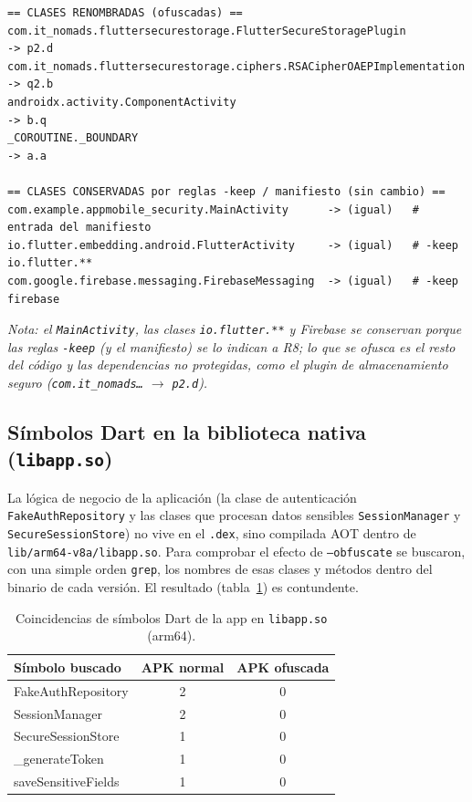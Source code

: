 \documentclass[12pt,letterpaper]{article}
\begin{document}
\begin{lstlisting}[caption={Correspondencias reales de nombres (\texttt{mapping.txt} de R8).},label=lst:jadx]
== CLASES RENOMBRADAS (ofuscadas) ==
com.it_nomads.fluttersecurestorage.FlutterSecureStoragePlugin          -> p2.d
com.it_nomads.fluttersecurestorage.ciphers.RSACipherOAEPImplementation -> q2.b
androidx.activity.ComponentActivity                                    -> b.q
_COROUTINE._BOUNDARY                                                   -> a.a

== CLASES CONSERVADAS por reglas -keep / manifiesto (sin cambio) ==
com.example.appmobile_security.MainActivity      -> (igual)   # entrada del manifiesto
io.flutter.embedding.android.FlutterActivity     -> (igual)   # -keep io.flutter.**
com.google.firebase.messaging.FirebaseMessaging  -> (igual)   # -keep firebase
\end{lstlisting}

\textit{Nota: el \texttt{MainActivity}, las clases \texttt{io.flutter.**} y
Firebase se conservan porque las reglas \texttt{-keep} (y el manifiesto) se lo
indican a R8; lo que se ofusca es el resto del código y las dependencias no
protegidas, como el \emph{plugin} de almacenamiento seguro
(\texttt{com.it\_nomads\ldots} $\rightarrow$ \texttt{p2.d}).}

\subsection{Símbolos Dart en la biblioteca nativa (\texttt{libapp.so})}

La lógica de negocio de la aplicación (la clase de autenticación
\texttt{FakeAuthRepository} y las clases que procesan datos sensibles
\texttt{SessionManager} y \texttt{SecureSessionStore}) no vive en el
\texttt{.dex}, sino compilada AOT dentro de \texttt{lib/arm64-v8a/libapp.so}.
Para comprobar el efecto de \texttt{--obfuscate} se buscaron, con una simple
orden \texttt{grep}, los nombres de esas clases y métodos dentro del binario de
cada versión. El resultado (tabla~\ref{tab:symbols}) es contundente.

\begin{table}[h]
\centering
\caption{Coincidencias de símbolos Dart de la app en \texttt{libapp.so} (arm64).}
\label{tab:symbols}
\renewcommand{\arraystretch}{1.2}
\begin{tabularx}{\linewidth}{>{\ttfamily}X c c}
\toprule
\normalfont Símbolo buscado & APK normal & APK ofuscada \\
\midrule
FakeAuthRepository  & 2 & 0 \\
SessionManager      & 2 & 0 \\
SecureSessionStore  & 1 & 0 \\
\_generateToken     & 1 & 0 \\
saveSensitiveFields & 1 & 0 \\
\bottomrule
\end{tabularx}
\end{table}
\end{document}
